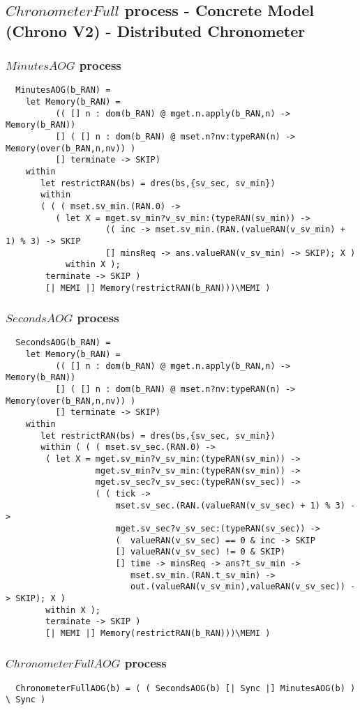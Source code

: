 \subsection{$ChronometerFull$ process - Concrete Model (Chrono V2) - Distributed Chronometer}
\subsubsection{$MinutesAOG$ process}


\begin{verbatim}
  MinutesAOG(b_RAN) =
    let Memory(b_RAN) =
          (( [] n : dom(b_RAN) @ mget.n.apply(b_RAN,n) -> Memory(b_RAN))
          [] ( [] n : dom(b_RAN) @ mset.n?nv:typeRAN(n) -> Memory(over(b_RAN,n,nv)) )
          [] terminate -> SKIP)
    within
       let restrictRAN(bs) = dres(bs,{sv_sec, sv_min})
       within
       ( ( ( mset.sv_min.(RAN.0) ->
          ( let X = mget.sv_min?v_sv_min:(typeRAN(sv_min)) ->
                    (( inc -> mset.sv_min.(RAN.(valueRAN(v_sv_min) + 1) % 3) -> SKIP
                    [] minsReq -> ans.valueRAN(v_sv_min) -> SKIP); X )
            within X );
        terminate -> SKIP )
        [| MEMI |] Memory(restrictRAN(b_RAN)))\MEMI )
\end{verbatim}
\subsubsection{$SecondsAOG$ process}

\begin{verbatim}
  SecondsAOG(b_RAN) =
    let Memory(b_RAN) =
          (( [] n : dom(b_RAN) @ mget.n.apply(b_RAN,n) -> Memory(b_RAN))
          [] ( [] n : dom(b_RAN) @ mset.n?nv:typeRAN(n) -> Memory(over(b_RAN,n,nv)) )
          [] terminate -> SKIP)
    within
       let restrictRAN(bs) = dres(bs,{sv_sec, sv_min})
       within ( ( ( mset.sv_sec.(RAN.0) ->
        ( let X = mget.sv_min?v_sv_min:(typeRAN(sv_min)) ->
                  mget.sv_min?v_sv_min:(typeRAN(sv_min)) ->
                  mget.sv_sec?v_sv_sec:(typeRAN(sv_sec)) ->
                  ( ( tick ->
                      mset.sv_sec.(RAN.(valueRAN(v_sv_sec) + 1) % 3) ->
                      mget.sv_sec?v_sv_sec:(typeRAN(sv_sec)) ->
                      (  valueRAN(v_sv_sec) == 0 & inc -> SKIP
                      [] valueRAN(v_sv_sec) != 0 & SKIP)
                      [] time -> minsReq -> ans?t_sv_min ->
                         mset.sv_min.(RAN.t_sv_min) ->
                         out.(valueRAN(v_sv_min),valueRAN(v_sv_sec)) -> SKIP); X )
        within X );
        terminate -> SKIP )
        [| MEMI |] Memory(restrictRAN(b_RAN)))\MEMI )
\end{verbatim}

\subsubsection{$ChronometerFullAOG$ process}

\begin{verbatim}
  ChronometerFullAOG(b) = ( ( SecondsAOG(b) [| Sync |] MinutesAOG(b) ) \ Sync )
\end{verbatim}
